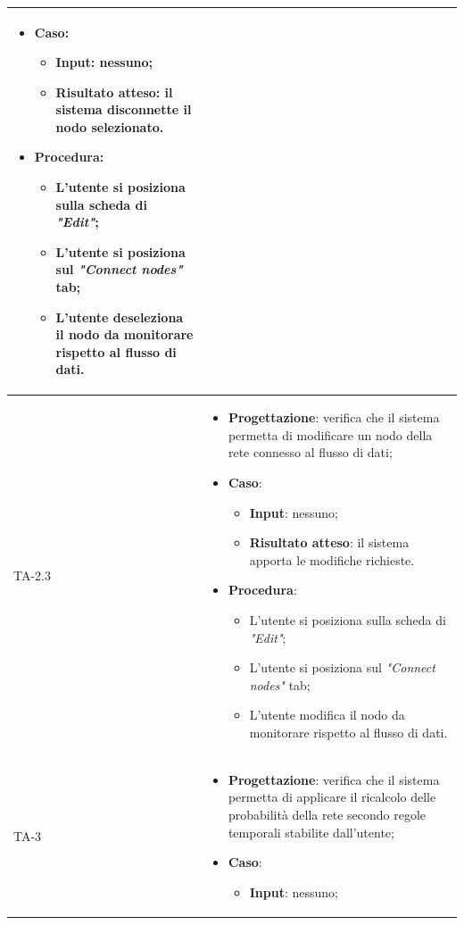 \begin{longtable}{|C{2.5cm}|C{13cm}|}
\begin{itemize}
	\item \textbf{Caso}: 
	\begin{itemize}
		\item \textbf{Input}: nessuno;
		\item \textbf{Risultato atteso}: il sistema disconnette il nodo selezionato.
	\end{itemize}
	\item \textbf{Procedura}:
	\begin{itemize}
		\item L'utente si posiziona sulla scheda di \emph{"Edit"};
		\item L'utente si posiziona sul \emph{"Connect nodes"} tab;
		\item L'utente deseleziona il nodo da monitorare rispetto al flusso di dati.
	\end{itemize} 
\end{itemize} \\
\hline
{TA-2.3} &
\begin{itemize}
	\item \textbf{Progettazione}: verifica che il sistema permetta di modificare un nodo della rete connesso al flusso di dati;
	\item \textbf{Caso}: 
	\begin{itemize}
		\item \textbf{Input}: nessuno;
		\item \textbf{Risultato atteso}: il sistema apporta le modifiche richieste.
	\end{itemize}
	\item \textbf{Procedura}:
	\begin{itemize}
		\item L'utente si posiziona sulla scheda di \emph{"Edit"};
		\item L'utente si posiziona sul \emph{"Connect nodes"} tab;
		\item L'utente modifica il nodo da monitorare rispetto al flusso di dati.
	\end{itemize} 
\end{itemize}\\
\hline
{TA-3} &
\begin{itemize}
	\item \textbf{Progettazione}: verifica che il sistema permetta di applicare il
	ricalcolo delle probabilità della rete
	secondo regole temporali stabilite dall'utente;
	\item \textbf{Caso}: 
	\begin{itemize}
		\item \textbf{Input}: nessuno;

\end{itemize}
\end{itemize}
\end{longtable}
